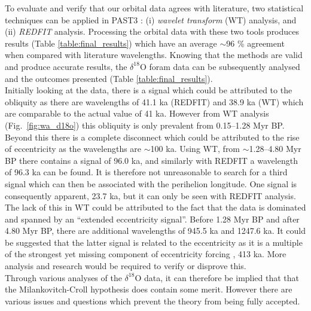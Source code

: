 \documentclass[12pt, onecolumn]{revtex4}    %
\begin{document}
To evaluate and verify that our orbital data agrees with literature, two statistical techniques can be applied in PAST3 \cite{past3}: (i) \textit{wavelet transform} (WT) analysis, and (ii) \textit{REDFIT} analysis. Processing the orbital data with these two tools produces results (Table \ref{table:final_results}) which have an average $\sim$96 \% agreement when compared with literature wavelengths. Knowing that the methods are valid and produce accurate results, the $\delta^{18}$O foram data can be subsequently analysed and the outcomes presented (Table \ref{table:final_results}).  \\

Initially looking at the data, there is a signal which could be attributed to the obliquity as there are wavelengths of 41.1 ka (REDFIT) and 38.9 ka (WT) which are comparable to the actual value of 41 ka. However from WT analysis (Fig.~\ref{fig:wa_d18o}) this obliquity is only prevalent from 0.15--1.28 Myr BP. Beyond this there is a complete disconnect which could be attributed to the rise of eccentricity as the wavelengths are $\sim$100 ka. Using WT, from $\sim$1.28--4.80 Myr BP there contains a signal of 96.0 ka, and similarly with REDFIT a wavelength of 96.3 ka can be found.  It is therefore not unreasonable to search for a third signal which can then be associated with the perihelion longitude. One signal is consequently apparent, 23.7 ka, but it can only be seen with REDFIT analysis. The lack of this in WT could be attributed to the fact that the data is dominated and spanned by an ``extended eccentricity signal''. Before 1.28 Myr BP and after 4.80 Myr BP, there are additional wavelengths of 945.5 ka and 1247.6 ka. It could be suggested that the latter signal is related to the eccentricity as it is a multiple of the strongest yet missing component of eccentricity forcing \cite{berger_climate}, 413 ka. More analysis and research would be required to verify or disprove this. \\

Through various analyses of the $\delta^{18}$O data, it can therefore be implied that that the Milankovitch-Croll hypothesis does contain some merit. However there are various issues and questions which prevent the theory from being fully accepted. \\
\end{document}
